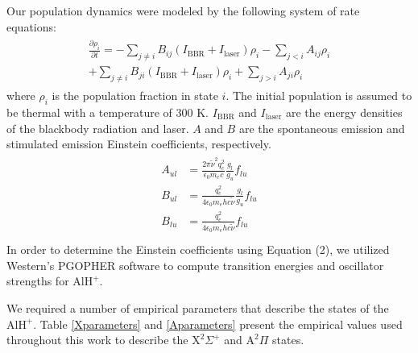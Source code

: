 \documentclass[twoside,twocolumn,9pt]{article}
\begin{document}
Our population dynamics were modeled by the following system of rate equations:
\begin{align}
\begin{aligned}
\frac{\partial\rho_i}{\partial t}=-\sum_{j\neq i}B_{ij}(I_{\mathrm{BBR}}+I_{\mathrm{laser}})\rho_i - \sum_{j<i}A_{ij}\rho_i \\
+\sum_{j\neq i}B_{ji}(I_{\mathrm{BBR}}+I_{\mathrm{laser}})\rho_i + \sum_{j>i}A_{ji}\rho_i 
\end{aligned}
\end{align}
where $\rho_i$ is the population fraction in state $i$. The initial population is assumed to be thermal with a temperature of 300 K. $I_{\mathrm{BBR}}$ and $I_{\mathrm{laser}}$ are the energy densities of the blackbody radiation and laser. $A$ and $B$ are the spontaneous emission and stimulated emission Einstein coefficients, respectively.
\begin{align}
\begin{aligned}
A_{ul} &= \frac{2\pi \widetilde{\nu}^2 q_e^2}{\epsilon_0 m_e c} \frac{g_l}{g_u} f_{lu}\\
B_{ul} &= \frac{q_e^2}{4 \epsilon_0 m_e h c \widetilde{\nu}} \frac{g_l}{g_u} f_{lu} \\
B_{lu} &= \frac{q_e^2}{4 \epsilon_0 m_e h c \widetilde{\nu}} f_{lu}\\
\end{aligned}
\end{align}
In order to determine the Einstein coefficients using Equation (2), we utilized Western's PGOPHER\cite{western2017pgopher} software to compute transition energies and oscillator strengths for $\mathrm{AlH}^+$. 

We required a number of empirical parameters that describe the states of the $\mathrm{AlH}^+$. Table \ref{Xparameters} and \ref{Aparameters} present the empirical values used throughout this work to describe the $\mathrm{X}^2 \Sigma^{+}$  and $\mathrm{A}^2\Pi$ states.
\end{document}
